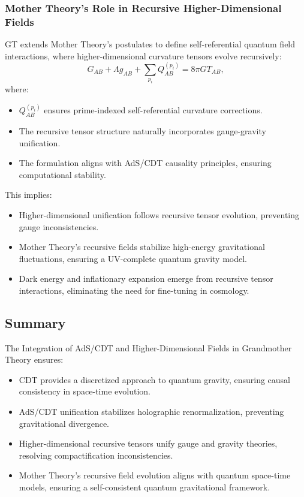 \documentclass{article}
\theoremstyle{plain}
\begin{document}
\subsubsection{Mother Theory’s Role in Recursive Higher-Dimensional Fields}
GT extends Mother Theory’s postulates to define self-referential quantum field interactions, where higher-dimensional curvature tensors evolve recursively:
\begin{equation}
G_{AB} + \Lambda g_{AB} + \sum_{p_i} Q_{AB}^{(p_i)} = 8\pi G T_{AB},
\end{equation}
where:
\begin{itemize}
\item $Q_{AB}^{(p_i)}$ ensures prime-indexed self-referential curvature corrections.
\item The recursive tensor structure naturally incorporates gauge-gravity unification.
\item The formulation aligns with AdS/CDT causality principles, ensuring computational stability.
\end{itemize}

This implies:
\begin{itemize}
\item Higher-dimensional unification follows recursive tensor evolution, preventing gauge inconsistencies.
\item Mother Theory’s recursive fields stabilize high-energy gravitational fluctuations, ensuring a UV-complete quantum gravity model.
\item Dark energy and inflationary expansion emerge from recursive tensor interactions, eliminating the need for fine-tuning in cosmology.
\end{itemize}

\subsection{Summary}
The Integration of AdS/CDT and Higher-Dimensional Fields in Grandmother Theory ensures:
\begin{itemize}
\item CDT provides a discretized approach to quantum gravity, ensuring causal consistency in space-time evolution.
\item AdS/CDT unification stabilizes holographic renormalization, preventing gravitational divergence.
\item Higher-dimensional recursive tensors unify gauge and gravity theories, resolving compactification inconsistencies.
\item Mother Theory’s recursive field evolution aligns with quantum space-time models, ensuring a self-consistent quantum gravitational framework.
\end{itemize}
\end{document}
